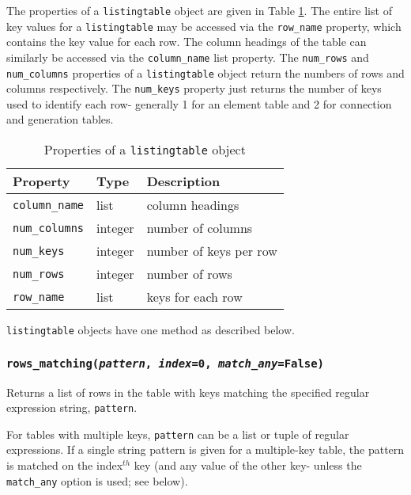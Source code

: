 The properties of a \texttt{listingtable} object are given in Table \ref{tb:listingtable_properties}.  The entire list of key values for a \texttt{listingtable} may be accessed via the \texttt{row\_name} property, which contains the key value for each row.  The column headings of the table can similarly be accessed via the \texttt{column\_name} list property.  The \texttt{num\_rows} and \texttt{num\_columns} properties of a \texttt{listingtable} object return the numbers of rows and columns respectively.  The \texttt{num\_keys} property just returns the number of keys used to identify each row- generally 1 for an element table and 2 for connection and generation tables.

\begin{table}
  \begin{center}
    \begin{tabular}{|l|l|l|}
      \hline
      \textbf{Property} & \textbf{Type} & \textbf{Description}\\
      \hline
      \texttt{column\_name} & list & column headings\\
      \texttt{num\_columns} & integer & number of columns \\
      \texttt{num\_keys} & integer & number of keys per row \\
      \texttt{num\_rows} & integer & number of rows \\
      \texttt{row\_name} & list & keys for each row \\
      \hline
    \end{tabular}
    \caption{Properties of a \texttt{listingtable} object}
    \label{tb:listingtable_properties}
  \end{center}
\end{table}

\texttt{listingtable} objects have one method as described below.

\subsubsection{\texttt{rows\_matching(\emph{pattern}, \emph{index}=0, \emph{match\_any}=False)}}

Returns a list of rows in the table with keys matching the specified regular expression string, \texttt{pattern}.

For tables with multiple keys, \texttt{pattern} can be a list or tuple of regular expressions.  If a single string pattern is given for a multiple-key table, the pattern is matched on the index$^{th}$ key (and any value of the other key- unless the \texttt{match\_any} option is used; see below).


